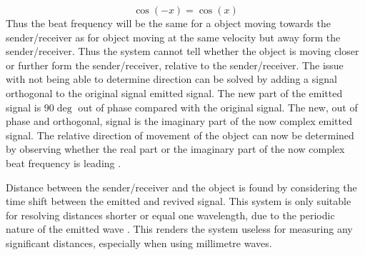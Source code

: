 \begin{equation} \label{eq:doppler}
    \cos(-x) = \cos(x)
\end{equation}
Thus the beat frequency will be the same for a object moving towards the sender/receiver as for object moving at the same velocity but away form the sender/receiver. Thus the system cannot tell whether the object is moving closer or further form the sender/receiver, relative to the sender/receiver. The issue with not being able to determine direction can be solved by adding a signal orthogonal to the original signal emitted signal. The new part of the emitted signal is $90 \deg$ out of phase compared with the original signal. The new, out of phase and orthogonal, signal is the imaginary part of the now complex emitted signal. The relative direction of movement of the object can now be determined by observing whether the real part or the imaginary part of the now complex beat frequency is leading \cite{douglas2022fmcw}.

Distance between the sender/receiver and the object is found by considering the time shift between the emitted and revived signal. This system is only suitable for resolving distances shorter or equal one wavelength, due to the periodic nature of the emitted wave \cite{douglas2022fmcw}. This renders the system useless for measuring any significant distances, especially when using millimetre waves.   
